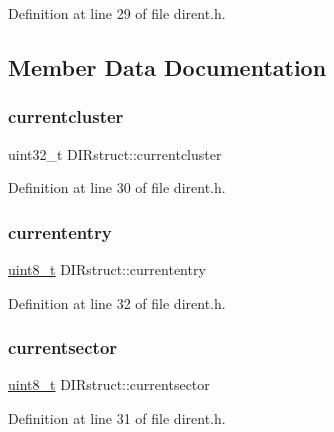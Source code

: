 Definition at line 29 of file dirent.\+h.



\subsection{Member Data Documentation}
\mbox{\label{structDIRstruct_a9941df3697e69fbc7ccafd2c05e85775}} 
\subsubsection{\texorpdfstring{currentcluster}{currentcluster}}
{\footnotesize\ttfamily uint32\+\_\+t D\+I\+Rstruct\+::currentcluster}



Definition at line 30 of file dirent.\+h.

\mbox{\label{structDIRstruct_a332a635460d5aa7b4c089d36544538bf}} 
\subsubsection{\texorpdfstring{currententry}{currententry}}
{\footnotesize\ttfamily \mbox{\hyperlink{stdint_8h_aba7bc1797add20fe3efdf37ced1182c5}{uint8\+\_\+t}} D\+I\+Rstruct\+::currententry}



Definition at line 32 of file dirent.\+h.

\mbox{\label{structDIRstruct_a03b84daedd4667e6cb11981789981238}} 
\subsubsection{\texorpdfstring{currentsector}{currentsector}}
{\footnotesize\ttfamily \mbox{\hyperlink{stdint_8h_aba7bc1797add20fe3efdf37ced1182c5}{uint8\+\_\+t}} D\+I\+Rstruct\+::currentsector}



Definition at line 31 of file dirent.\+h.

\mbox{\label{structDIRstruct_ab5e42f8d70fa0bc1c1832f44fe0a84b1}} 
